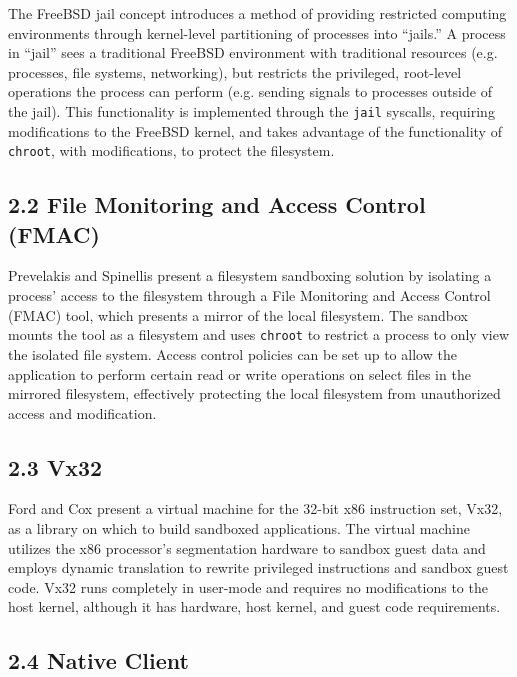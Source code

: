 \documentclass{proc}
\begin{document}
The FreeBSD jail concept \cite{kamp2000jails} introduces a method of providing restricted computing environments through kernel-level partitioning of processes into ``jails.'' A process in ``jail'' sees a traditional FreeBSD environment with traditional resources (e.g. processes, file systems, networking), but restricts the privileged, root-level operations the process can perform (e.g. sending signals to processes outside of the jail). This functionality is implemented through the \texttt{jail} syscalls, requiring modifications to the FreeBSD kernel, and takes advantage of the functionality of \texttt{chroot}, with modifications, to protect the filesystem.

\subsection*{2.2 File Monitoring and Access Control (FMAC)}

Prevelakis and Spinellis \cite{prevelakis2001fmac} present a filesystem sandboxing solution by isolating a process' access to the filesystem through a File Monitoring and Access Control (FMAC) tool, which presents a mirror of the local filesystem. The sandbox mounts the tool as a filesystem and uses \texttt{chroot} to restrict a process to only view the isolated file system. Access control policies can be set up to allow the application to perform certain read or write operations on select files in the mirrored filesystem, effectively protecting the local filesystem from unauthorized access and modification.

\subsection*{2.3 Vx32}

Ford and Cox \cite{ford2008vx32} present a virtual machine for the 32-bit x86 instruction set, Vx32, as a library on which to build sandboxed applications. The virtual machine utilizes the x86 processor's segmentation hardware to sandbox guest data and employs dynamic translation to rewrite privileged instructions and sandbox guest code. Vx32 runs completely in user-mode and requires no modifications to the host kernel, although it has hardware, host kernel, and guest code requirements.

\subsection*{2.4 Native Client}
\end{document}
